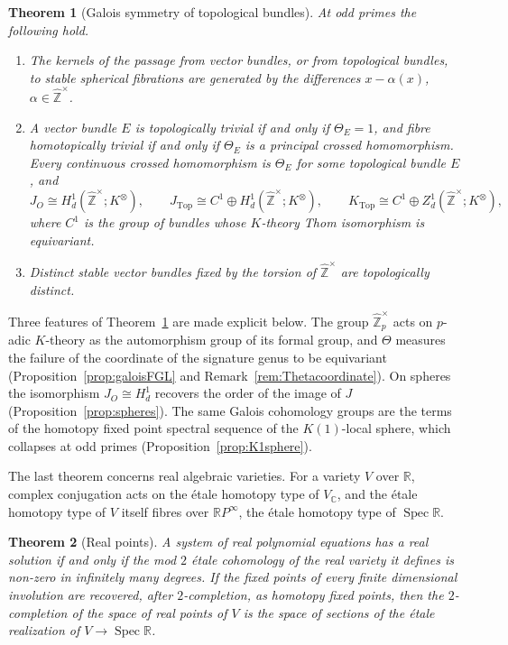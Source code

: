 \documentclass[11pt]{amsart}
\theoremstyle{plain}
\newtheorem{theoremA}{Theorem}
\theoremstyle{definition}
\numberwithin{equation}{section}
\newcommand{\R}{\mathbb{R}}
\newcommand{\C}{\mathbb{C}}
\newcommand{\Zhat}{\widehat{\mathbb{Z}}}
\newcommand{\RP}{\mathbb{R}P}
\newcommand{\Ktop}{K_{\mathrm{Top}}}
\newcommand{\units}{^{\times}}
\DeclareMathOperator{\Spec}{Spec}
\begin{document}
\begin{theoremA}[Galois symmetry of topological bundles]\label{thm:E}
At odd primes the following hold.
\begin{enumerate}[label=\textup{(\arabic*)}]
\item The kernels of the passage from vector bundles, or from topological bundles, to stable spherical fibrations are generated by the differences $x-\alpha(x)$, $\alpha\in\Zhat\units$.
\item A vector bundle $E$ is topologically trivial if and only if $\Theta_E=1$, and fibre homotopically trivial if and only if $\Theta_E$ is a principal crossed homomorphism.
Every continuous crossed homomorphism is $\Theta_E$ for some topological bundle $E$, and
\[
J_O\cong H^1_d(\Zhat\units;K^\otimes),\qquad J_{\mathrm{Top}}\cong C^1\oplus H^1_d(\Zhat\units;K^\otimes),\qquad \Ktop\cong C^1\oplus Z^1_d(\Zhat\units;K^\otimes),
\]
where $C^1$ is the group of bundles whose $K$-theory Thom isomorphism is equivariant.
\item Distinct stable vector bundles fixed by the torsion of $\Zhat\units$ are topologically distinct.
\end{enumerate}
\end{theoremA}

Three features of Theorem~\ref{thm:E} are made explicit below.
The group $\Zhat_p\units$ acts on $p$-adic $K$-theory as the automorphism group of its formal group, and $\Theta$ measures the failure of the coordinate of the signature genus to be equivariant (Proposition~\ref{prop:galoisFGL} and Remark~\ref{rem:Thetacoordinate}).
On spheres the isomorphism $J_O\cong H^1_d$ recovers the order of the image of $J$ (Proposition~\ref{prop:spheres}).
The same Galois cohomology groups are the terms of the homotopy fixed point spectral sequence of the $K(1)$-local sphere, which collapses at odd primes (Proposition~\ref{prop:K1sphere}).

The last theorem concerns real algebraic varieties.
For a variety $V$ over $\R$, complex conjugation acts on the \'etale homotopy type of $V_\C$, and the \'etale homotopy type of $V$ itself fibres over $\RP^\infty$, the \'etale homotopy type of $\Spec\R$.

\begin{theoremA}[Real points]\label{thm:F}
A system of real polynomial equations has a real solution if and only if the mod $2$ \'etale cohomology of the real variety it defines is non-zero in infinitely many degrees.
If the fixed points of every finite dimensional involution are recovered, after $2$-completion, as homotopy fixed points, then the $2$-completion of the space of real points of $V$ is the space of sections of the \'etale realization of $V\to\Spec\R$.
\end{theoremA}
\end{document}
